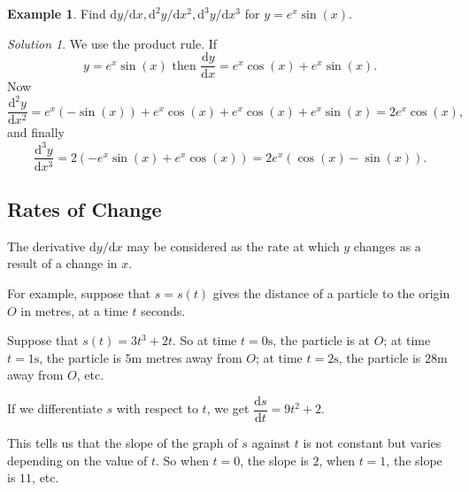 \documentclass[
  11pt,
  oneside]{book}
\newcommand{\slide}{}
\theoremstyle{definition}
\theoremstyle{definition}
\newtheorem{example}{Example}[chapter]
\theoremstyle{definition}
\theoremstyle{definition}
\theoremstyle{remark}
\newtheorem*{solution}{Solution}
\begin{document}
\begin{example}
Find \(\mathrm{d}y/\mathrm{d} x, \mathrm{d}^{2}y/\mathrm{d} x^2, \mathrm{d}^{3}y/\mathrm{d} x^{3}\) for \(y =e^x\sin(x)\).
\end{example}

\begin{solution}
We use the product rule. If
\[
y=e^x\sin(x)\text{ then }\frac{\mathrm{d} y}{\mathrm{d} x} = e^x\cos(x) + e^x\sin(x).
\]
Now
\[
\frac{\mathrm{d}^{2}y}{\mathrm{d} x^2} = e^x(-\sin(x)) + e^x\cos(x) + e^x\cos(x)+e^x\sin(x) = 2e^x\cos(x),
\]
and finally
\[
\frac{\mathrm{d}^{3}y}{\mathrm{d} x^{3}} = 2(-e^x\sin(x)+e^x\cos(x)) = 2e^x(\cos(x)-\sin(x)).
\]
\end{solution}

\slide

\subsection{Rates of Change}\label{rates-of-change}

\begin{notslides}

The derivative \(\mathrm{d}y/\mathrm{d} x\) may be considered as the rate at which \(y\) changes as a result of a change in \(x\).

For example, suppose that \(s=s(t)\) gives the distance of a particle to the origin \(O\) in metres, at a time \(t\) seconds.

Suppose that \(s(t) = 3t^3 + 2t\). So at time \(t = 0\text{s}\), the particle is at \(O\); at time \(t = 1\text{s}\), the particle is \(5\text{m}\) metres away from \(O\); at time \(t = 2\text{s}\), the particle is \(28\text{m}\) away from \(O\), etc.

If we differentiate \(s\) with respect to \(t\), we get \(\dfrac{\mathrm{d} s}{\mathrm{d} t} = 9t^2 + 2\).

This tells us that the slope of the graph of \(s\) against \(t\) is not constant but varies depending on the value of \(t\). So when \(t = 0\), the slope is \(2\), when \(t = 1\), the slope is \(11\), etc.

\end{notslides}
\end{document}
